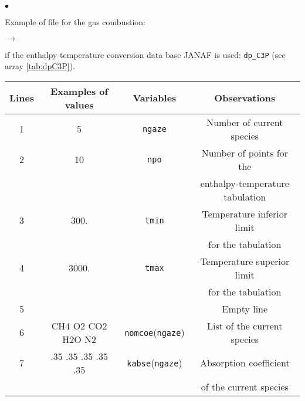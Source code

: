 {{\begin{list}{$\bullet$}{}
       \item Example of file for the gas combustion:
        \begin{list}{$\rightarrow$}{}
               \item if the enthalpy-temperature conversion data base
                     JANAF is used: \texttt{dp\_C3P} (see
                     array \ref{tab:dpC3P}).

\begin{table}[htbp]
\begin{center}
\small{
\begin{tabular}{|c|c|c|c|} \hline
 Lines  &Examples of values &        Variables             & Observations                                     \\ \hline
  1     &         5         &  \texttt{ngaze\index{ngaze}} & Number of current species                        \\ \hline
  2     &        10         &   \texttt{npo\index{npo}}    & Number of points for the                         \\
        &                   &                              & enthalpy-temperature tabulation                  \\ \hline
  3     &       300.        &  \texttt{tmin\index{tmin}}   & Temperature inferior limit                       \\
        &                   &                              & for the tabulation                               \\ \hline
  4     &      3000.        &  \texttt{tmax\index{tmax}}   & Temperature superior limit                       \\
        &                   &                              & for the tabulation                               \\ \hline
  5     &                   &                              & Empty line                                       \\ \hline
  6     & CH4 O2 CO2 H2O N2 &  \texttt{nomcoe\index{nomcoe}}(\texttt{ngaze}) & List of the current species                      \\ \hline
  7     &.35 .35 .35 .35 .35&  \texttt{kabse\index{kabse}}(\texttt{ngaze})   & Absorption coefficient                           \\
        &                   &                              & of  the current species                          \\ \hline

\end{tabular}}
\end{center}
\end{table}
\end{list}
\end{list}}}
